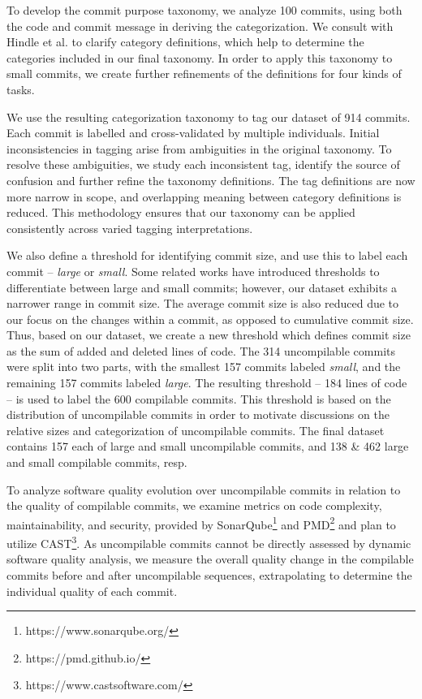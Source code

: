 To develop the commit purpose taxonomy, we analyze 100 commits, using both the code and commit message in deriving the categorization. We consult with Hindle et al. to clarify category definitions, which help to determine the categories included in our final taxonomy. 
In order to apply this taxonomy to small commits, we create further refinements of the definitions for four kinds of tasks. 

We use the resulting categorization taxonomy to tag our dataset of 914 commits. Each commit is labelled and cross-validated by multiple individuals. 
Initial inconsistencies in tagging arise from ambiguities in the original taxonomy. 
To resolve these ambiguities, we study each inconsistent tag, identify the source of confusion and further refine the taxonomy definitions. 
The tag definitions are now more narrow in scope, and overlapping meaning between category definitions is reduced. 
This methodology ensures that our taxonomy can be applied consistently across varied tagging interpretations. 

We also define a threshold for identifying commit size, and use this to label each commit -- \textit{large} or \textit{small}. 
Some related works have introduced thresholds to differentiate between large and small commits; however, our dataset exhibits a narrower range in commit size. 
The average commit size is also reduced due to our focus on the changes within a commit, as opposed to cumulative commit size. 
Thus, based on our dataset, we create a new threshold which defines commit size as the sum of added and deleted lines of code. The 314 uncompilable commits were split into two parts, with the smallest 157 commits labeled \textit{small}, and the remaining 157 commits labeled \textit{large}. 
The resulting threshold -- 184 lines of code -- is used to label the 600 compilable commits.
This threshold is based on the distribution of uncompilable commits in order to motivate discussions on the relative sizes and categorization of uncompilable commits. The final dataset contains 157 each of large and small uncompilable commits, and 138 \& 462 large and small compilable commits, resp.

To analyze software quality evolution over uncompilable commits in relation to the quality of compilable commits, we examine metrics on code complexity, maintainability, and security, provided by SonarQube\footnote{https://www.sonarqube.org/} and PMD\footnote{https://pmd.github.io/} and plan to utilize CAST\footnote{https://www.castsoftware.com/}. As uncompilable commits cannot be directly assessed by dynamic software quality analysis, we measure the overall quality change in the compilable commits before and after uncompilable sequences, extrapolating to determine the individual quality of each commit. 


